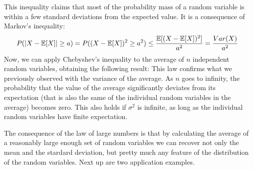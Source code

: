 This inequality claims that most of the probability mass of a random variable is within a few standard deviations from the expected value. It is a consequence of Markov's inequality:
\begin{align*}
    P(|X - \mathbb{E}[X]| \geq a) = P((X - \mathbb{E}[X])^2 \geq a^2) \leq \frac{\mathbb{E}[(X - \mathbb{E}[X])^2]}{a^2} = \frac{Var(X)}{a^2}
\end{align*}
Now, we can apply Chebyshev's inequality to the average of $n$ independent random variables, obtaining the following result:
This law confirms what we previously observed with the variance of the average. As $n$ goes to infinity, the probability that the value of the average significantly deviates from its expectation (that is also the same of the individual random variables in the average) becomes zero. This also holds if $\sigma^2$ is infinite, as long as the individual random variables have finite expectation.

The consequence of the law of large numbers is that by calculating the average of a reasonably large enough set of random variables we can recover not only the mean and the stardard deviation, but pretty much any feature of the distribution of the random variables. Next up are two application examples.

